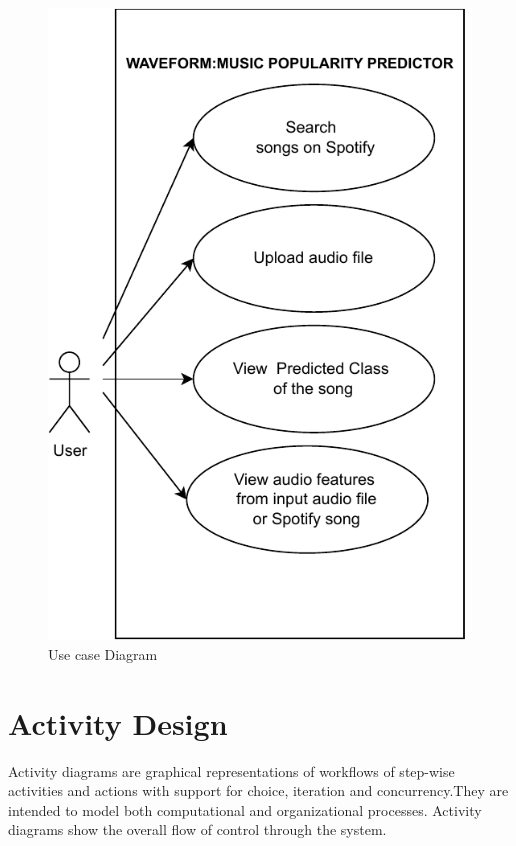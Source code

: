 \documentclass[11pt]{report}
\begin{document}
\begin{figure}[H]
    \centering
    \includegraphics[scale=1]{PDF/UseCase Diagram.pdf}
    \caption{Use case Diagram}
    \label{fig:Use case diagram for Waveform}
\end{figure}
\clearpage

\section{Activity Design}
Activity diagrams are graphical representations of workflows of step-wise activities and actions with support for choice, iteration and concurrency.They are intended to model both computational and organizational processes. Activity diagrams show the overall flow of control through the system.
\end{document}
